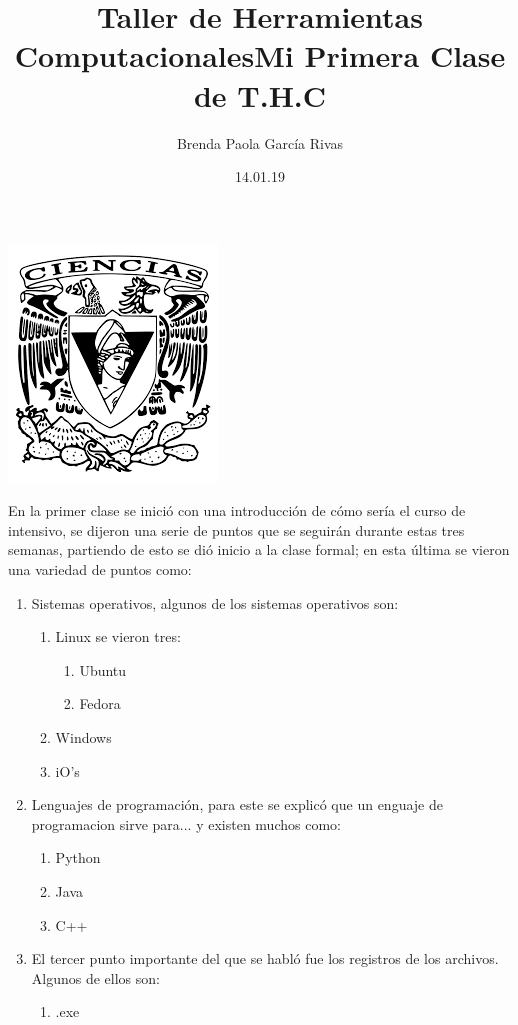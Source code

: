 \documentclass[letterpaper, 12pt, oneside]{article}
\title{\huge \color{red} Taller de Herramientas Computacionales}
\author{Brenda Paola García Rivas}
\date{14.01.19}
\begin{document}
	\maketitle
	\begin{center}
		\includegraphics[scale=0.90]{1.png}
	\end{center}
	\newpage
	\title{\Huge Mi Primera Clase de T.H.C\\}
	
	En la primer clase se inició con una introducción de cómo sería el curso de intensivo, se dijeron una serie de puntos que se seguirán durante estas tres semanas, partiendo de esto se dió inicio a la clase formal; en  esta última se vieron una variedad de puntos como:
	\begin{enumerate}
		\item
		Sistemas operativos, algunos de los sistemas operativos son:
		\begin{enumerate}
			\item 
			Linux se vieron tres:
			\begin{enumerate}
				\item 
				Ubuntu
				\item 
				Fedora
			\end{enumerate}
			\item 
			Windows
			\item
			iO's
		\end{enumerate}
	\item 
	Lenguajes de programación, para este se explicó que un enguaje de programacion sirve para... y existen muchos como:
	\begin{enumerate}
		\item 
		Python 
		\item 
		Java
		\item 
		C++
	\end{enumerate}
	\item 
	El tercer punto importante del que se habló fue los registros de los archivos. Algunos de ellos son:
	\begin{enumerate}
		\item
		.exe 
	\end{enumerate}
\end{enumerate}
\end{document}
